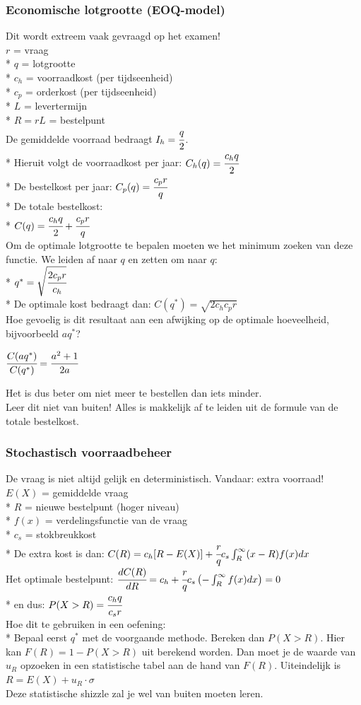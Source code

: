 \documentclass[12pt]{article}
\begin{document}
\subsubsection{Economische lotgrootte (EOQ-model)}
Dit wordt extreem vaak gevraagd op het examen!\\
$r$ = vraag\\*
$q$ = lotgrootte\\*
$c_h$ = voorraadkost (per tijdseenheid)\\*
$c_p$ = orderkost (per tijdseenheid)\\*
$L$ = levertermijn\\*
$R = rL$ = bestelpunt\\
De gemiddelde voorraad bedraagt $I_h = \cfrac{q}{2}$.\\*
Hieruit volgt de voorraadkost per jaar: $C_h(q) = \cfrac{c_hq}{2}$\\*
De bestelkost per jaar: $C_p(q) = \cfrac{c_pr}{q}$\\*
De totale bestelkost:\\*
$C(q) = \cfrac{c_hq}{2} + \cfrac{c_pr}{q}$\\
Om de optimale lotgrootte te bepalen moeten we het minimum zoeken van deze functie. We leiden af naar $q$ en zetten om naar $q$:\\*
$q^* = \sqrt{\cfrac{2c_pr}{c_h}}$\\*
De optimale kost bedraagt dan: $C(q^*) = \sqrt{2c_hc_pr}$\\
Hoe gevoelig is dit resultaat aan een afwijking op de optimale hoeveelheid, bijvoorbeeld $aq^*$?
\begin{center}
$\cfrac{C(aq^*)}{C(q^*)} = \cfrac{a^2+1}{2a}$
\end{center}
Het is dus beter om niet meer te bestellen dan iets minder.\\
Leer dit niet van buiten! Alles is makkelijk af te leiden uit de formule van de totale bestelkost.
\subsubsection{Stochastisch voorraadbeheer}
De vraag is niet altijd gelijk en deterministisch. Vandaar: extra voorraad!\\
$E(X)$ = gemiddelde vraag\\*
$R$ = nieuwe bestelpunt (hoger niveau)\\*
$f(x)$ = verdelingsfunctie van de vraag\\*
$c_s$ = stokbreukkost\\*
De extra kost is dan: $C(R) = c_h[R-E(X)] + \cfrac{r}{q}c_s\int_R^\infty(x-R)f(x)dx$\\
Het optimale bestelpunt: $\cfrac{dC(R)}{dR} = c_h + \cfrac{r}{q}c_s\left(-\int_R^\infty f(x)dx\right) = 0$\\*
en dus: $P(X>R) = \cfrac{c_hq}{c_sr}$\\
Hoe dit te gebruiken in een oefening:\\*
Bepaal eerst $q^*$ met de voorgaande methode. Bereken dan $P(X>R)$. Hier kan $F(R) = 1-P(X>R)$ uit berekend worden. Dan moet je de waarde van $u_R$ opzoeken in een statistische tabel aan de hand van $F(R)$. Uiteindelijk is $R = E(X) + u_R \cdot \sigma$\\
Deze statistische shizzle zal je wel van buiten moeten leren.
\end{document}
